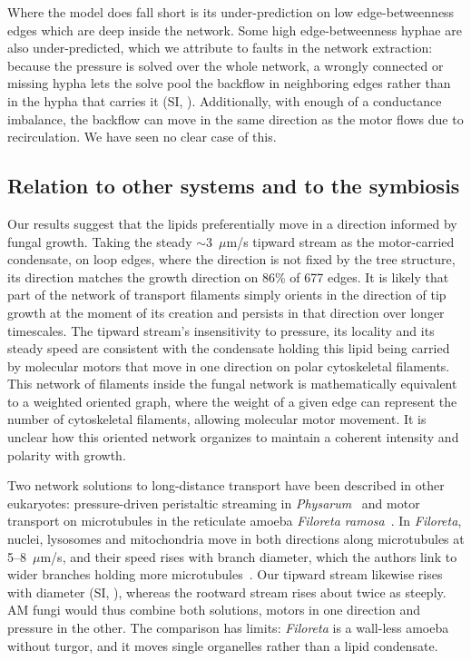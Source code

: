 Where the model does fall short is its under-prediction on low edge-betweenness edges which are deep inside the network.
Some high edge-betweenness hyphae are also under-predicted, which we attribute to faults in the network extraction: because the pressure is solved over the whole network, a wrongly connected or missing hypha lets the solve pool the backflow in neighboring edges rather than in the hypha that carries it (SI, ).
Additionally, with enough of a conductance imbalance, the backflow can move in the same direction as the motor flows due to recirculation.
We have seen no clear case of this.

\subsection*{Relation to other systems and to the symbiosis}

Our results suggest that the lipids preferentially move in a direction informed by fungal growth.
Taking the steady $\sim$3~$\mu$m/s tipward stream as the motor-carried condensate, on loop edges, where the direction is not fixed by the tree structure, its direction matches the growth direction on 86\% of 677 edges.
It is likely that part of the network of transport filaments simply orients in the direction of tip growth at the moment of its creation and persists in that direction over longer timescales.
The tipward stream's insensitivity to pressure, its locality and its steady speed are consistent with the condensate holding this lipid being carried by molecular motors that move in one direction on polar cytoskeletal filaments.
This network of filaments inside the fungal network is mathematically equivalent to a weighted oriented graph, where the weight of a given edge can represent the number of cytoskeletal filaments, allowing molecular motor movement.
It is unclear how this oriented network organizes to maintain a coherent intensity and polarity with growth. 

Two network solutions to long-distance transport have been described in other eukaryotes: pressure-driven peristaltic streaming in \textit{Physarum}~\cite{alim_mechanism_2017} and motor transport on microtubules in the reticulate amoeba \textit{Filoreta ramosa}~\cite{guest_multiple_2026}.
In \textit{Filoreta}, nuclei, lysosomes and mitochondria move in both directions along microtubules at 5--8~$\mu$m/s, and their speed rises with branch diameter, which the authors link to wider branches holding more microtubules~\cite{guest_multiple_2026}.
Our tipward stream likewise rises with diameter (SI, ), whereas the rootward stream rises about twice as steeply.
AM fungi would thus combine both solutions, motors in one direction and pressure in the other.
The comparison has limits: \textit{Filoreta} is a wall-less amoeba without turgor, and it moves single organelles rather than a lipid condensate.

